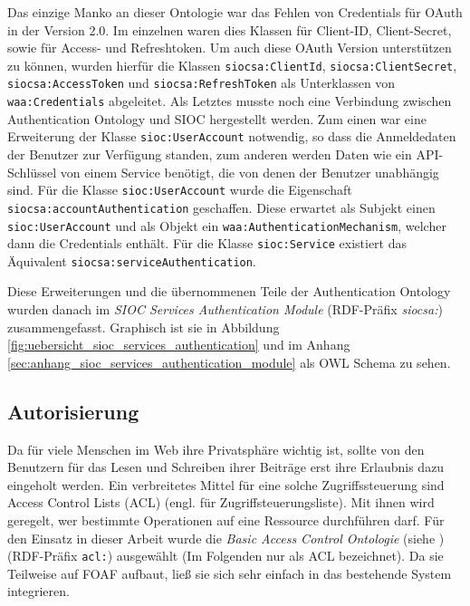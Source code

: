 Das einzige Manko an dieser Ontologie war das Fehlen von Credentials für OAuth in der Version 2.0. Im einzelnen waren dies Klassen für Client-ID, Client-Secret, sowie für Access- und Refreshtoken. Um auch diese OAuth Version unterstützen zu können, wurden hierfür die Klassen \texttt{siocsa:ClientId}, \texttt{siocsa:ClientSecret}, \texttt{siocsa:AccessToken} und \texttt{siocsa:RefreshToken} als Unterklassen von \texttt{waa:Credentials} abgeleitet. Als Letztes musste noch eine Verbindung zwischen Authentication Ontology und SIOC hergestellt werden. Zum einen war eine Erweiterung der Klasse \texttt{sioc:UserAccount} notwendig, so dass die Anmeldedaten der Benutzer zur Verfügung standen, zum anderen werden Daten wie ein API-Schlüssel von einem Service benötigt, die von denen der Benutzer unabhängig sind. Für die Klasse \texttt{sioc:UserAccount} wurde die Eigenschaft \texttt{siocsa:accountAuthentication} geschaffen. Diese erwartet als Subjekt einen \texttt{sioc:UserAccount} und als Objekt ein \texttt{waa:AuthenticationMechanism}, welcher dann die Credentials enthält. Für die Klasse \texttt{sioc:Service} existiert das Äquivalent \texttt{siocsa:serviceAuthentication}. 

Diese Erweiterungen und die übernommenen Teile der Authentication Ontology wurden danach im \emph{SIOC Services Authentication Module} (RDF-Präfix \emph{siocsa:}) zusammengefasst. Graphisch ist sie in Abbildung \ref{fig:uebersicht_sioc_services_authentication} und im Anhang \ref{sec:anhang_sioc_services_authentication_module} als OWL Schema zu sehen. 


\subsection{Autorisierung} %
\label{sub:autorisierung}

Da für viele Menschen im Web ihre Privatsphäre wichtig ist, sollte von den Benutzern für das Lesen und Schreiben ihrer Beiträge erst ihre Erlaubnis dazu eingeholt werden. Ein verbreitetes Mittel für eine solche Zugriffssteuerung sind Access Control Lists (ACL) (engl. für Zugriffsteuerungsliste). Mit ihnen wird geregelt, wer bestimmte Operationen auf eine Ressource durchführen darf. Für den Einsatz in dieser Arbeit wurde die \emph{Basic Access Control Ontologie} (siehe \cite{Hollenbach2009,wiki:wacl})(RDF-Präfix \texttt{acl:}) ausgewählt (Im Folgenden nur als ACL bezeichnet). Da sie Teilweise auf FOAF aufbaut, ließ sie sich sehr einfach in das bestehende System integrieren.

